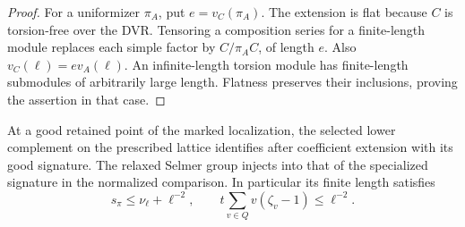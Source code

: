 \begin{proof}
For a uniformizer \(\pi_A\), put \(e=v_C(\pi_A)\). The extension is flat
because \(C\) is torsion-free over the DVR. Tensoring a composition series
for a finite-length module replaces each simple factor by
\(C/\pi_A C\), of length \(e\). Also \(v_C(\ell)=e v_A(\ell)\).
An infinite-length torsion module has finite-length submodules of arbitrarily
large length. Flatness preserves their inclusions, proving the assertion
in that case.
\end{proof}

\begin{lemma}\label{lem:retained-signature-specialization}
At a good retained point of the marked localization, the
selected lower complement on the prescribed lattice identifies
after coefficient extension with its good signature. The
relaxed Selmer group injects into that of the specialized
signature in the normalized comparison. In particular its
finite length satisfies
\[
 s_\pi\le\nu_\ell+\ell^{-2},\qquad
 t\sum_{v\in Q}v(\zeta_v-1)\le \ell^{-2}.
\]
\end{lemma}

